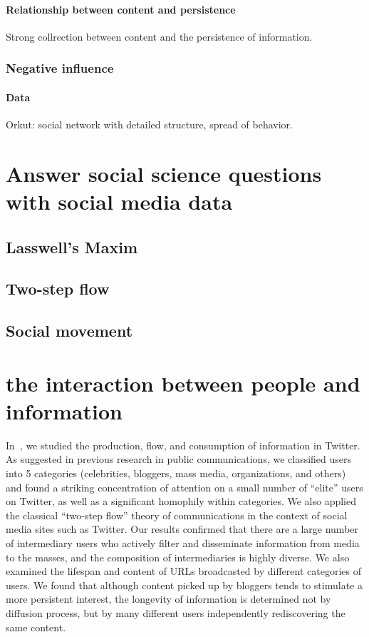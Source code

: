 \documentclass[phd,tocprelim]{cornell}
\begin{document}
\subsubsection{Relationship between content and persistence}
Strong collrection between content and the persistence of information.

\subsection{Negative influence}

\subsubsection{Data}
Orkut: social network with detailed structure, spread of behavior.


\chapter{Answer social science questions with social media data}
\section{Lasswell's Maxim}

\section{Two-step flow}

\section{Social movement}


\chapter{the interaction between people and information}

In~\cite{Wu-Twitter-2011}, we studied the production, flow, and consumption of information in Twitter. As suggested in previous research in public communications, we classified users into 5 categories (celebrities, bloggers, mass media, organizations, and others) and found a striking concentration of attention on a small number of ``elite'' users on Twitter, as well as a significant homophily within categories. We also applied the classical ``two-step flow'' theory of communications in the context of social media sites such as Twitter. Our results confirmed that there are a large number of intermediary users who actively filter and disseminate information from media to the masses, and the composition of intermediaries is highly diverse. We also examined the lifespan and content of URLs broadcasted by different categories of users. We found that although content picked up by bloggers tends to stimulate a more persistent interest, the longevity of information is determined not by diffusion process, but by many different users independently rediscovering the same content.
\end{document}
